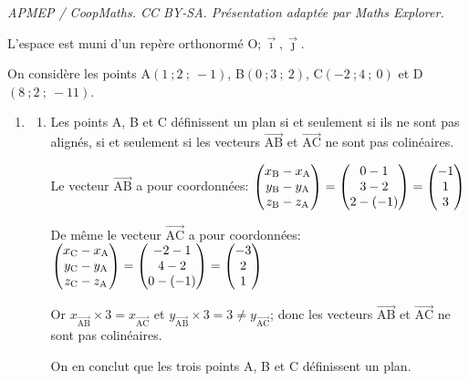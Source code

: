 \documentclass[10pt]{article}
\providecommand{\vectt}[1]{\overrightarrow{\mathrm{#1}}}
\providecommand{\Oij}{\(\mathrm{O};\vec{\imath},\vec{\jmath}\)}
\begin{document}
\noindent\textit{APMEP / CoopMaths. CC BY-SA. Présentation adaptée par Maths Explorer.}\par\medskip
L'espace est muni d'un repère orthonormé \Oij.

On considère les points A$(1~;2~;~-1)$, B$(0~;3~;~2)$, C$(-2~;4~;~0)$ et D$(8~;2~;~-11)$.

\begin{enumerate}
\item
\begin{enumerate}[label=\textbf{\alph*.}]
\item 
Les points A, B et C définissent un plan si et seulement si ils ne sont pas alignés, si et seulement si les vecteurs $\vectt{AB}$ et $\vectt{AC}$ ne sont pas colinéaires.

Le vecteur $\vectt{AB}$ a pour coordonnées: 
$\begin{pmatrix}
x_{\text B} - x_{\text A} \\ y_{\text B} - y_{\text A} \\ z_{\text B} - z_{\text A}
\end{pmatrix}
=
\begin{pmatrix}
0 - 1 \\ 3-2 \\ 2-(-1) 
\end{pmatrix}
=
\begin{pmatrix}
-1 \\ 1 \\3
\end{pmatrix}$

De même le vecteur $\vectt{AC}$ a pour coordonnées: 
$\begin{pmatrix}
x_{\text C} - x_{\text A} \\ y_{\text C} - y_{\text A} \\ z_{\text C} - z_{\text A}
\end{pmatrix}
=
\begin{pmatrix}
-2-1 \\ 4-2 \\ 0-(-1)
\end{pmatrix}
=
\begin{pmatrix}
-3 \\ 2 \\ 1
\end{pmatrix}$

Or $x_{\vectt{AB}} \times 3 = x_{\vectt{AC}}$ et $y_{\vectt{AB}} \times 3 = 3 \neq y_{\vectt{AC}}$; donc les vecteurs $\vectt{AB}$ et $\vectt{AC}$ ne sont pas colinéaires.

On en conclut que les trois points A, B et C définissent un plan.  


\end{enumerate}
\end{enumerate}
\end{document}
